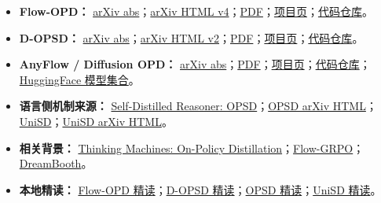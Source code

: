\begin{itemize}[leftmargin=1.5em]
  \item \textbf{Flow-OPD：} \href{https://arxiv.org/abs/2605.08063}{arXiv abs}；\href{https://arxiv.org/html/2605.08063v4}{arXiv HTML v4}；\href{https://arxiv.org/pdf/2605.08063}{PDF}；\href{https://costaliya.github.io/Flow-OPD/}{项目页}；\href{https://github.com/CostaliyA/Flow-OPD}{代码仓库}。
  \item \textbf{D-OPSD：} \href{https://arxiv.org/abs/2605.05204}{arXiv abs}；\href{https://arxiv.org/html/2605.05204v2}{arXiv HTML v2}；\href{https://arxiv.org/pdf/2605.05204}{PDF}；\href{https://vvvvvjdy.github.io/d-opsd}{项目页}；\href{https://github.com/vvvvvjdy/D-OPSD}{代码仓库}。
  \item \textbf{AnyFlow / Diffusion OPD：} \href{https://arxiv.org/abs/2605.13724}{arXiv abs}；\href{https://arxiv.org/pdf/2605.13724}{PDF}；\href{https://nvlabs.github.io/AnyFlow/}{项目页}；\href{https://github.com/NVlabs/AnyFlow}{代码仓库}；\href{https://huggingface.co/collections/nvidia/anyflow}{HuggingFace 模型集合}。
  \item \textbf{语言侧机制来源：} \href{https://arxiv.org/abs/2601.18734}{Self-Distilled Reasoner: OPSD}；\href{https://arxiv.org/html/2601.18734v3}{OPSD arXiv HTML}；\href{https://arxiv.org/abs/2605.06597}{UniSD}；\href{https://arxiv.org/html/2605.06597v1}{UniSD arXiv HTML}。
  \item \textbf{相关背景：} \href{https://thinkingmachines.ai/blog/on-policy-distillation}{Thinking Machines: On-Policy Distillation}；\href{https://arxiv.org/abs/2505.05470}{Flow-GRPO}；\href{https://arxiv.org/abs/2208.12242}{DreamBooth}。
  \item \textbf{本地精读：} \href{run:reading/paper_deep_reading/image_models/2026_05_14_flow_opd.tex}{Flow-OPD 精读}；\href{run:reading/paper_deep_reading/image_models/2026_05_14_d_opsd.tex}{D-OPSD 精读}；\href{run:reading/paper_deep_reading/post_training/2026_05_14_opsd.tex}{OPSD 精读}；\href{run:reading/paper_deep_reading/post_training/2026_05_09_unisd.tex}{UniSD 精读}。
\end{itemize}

